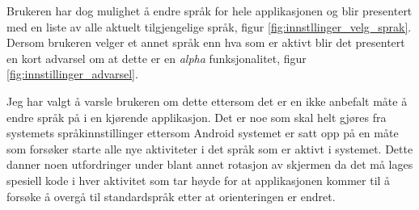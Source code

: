 Brukeren har dog mulighet å endre språk for hele applikasjonen og blir presentert med en liste av alle aktuelt tilgjengelige språk, figur \ref{fig:innstllinger_velg_sprak}. Dersom brukeren velger et annet språk enn hva som er aktivt blir det presentert en kort advarsel om at dette er en \textit{alpha} funksjonalitet, figur \ref{fig:innstillinger_advarsel}. 

Jeg har valgt å varsle brukeren om dette ettersom det er en ikke anbefalt måte å endre språk på i en kjørende applikasjon. Det er noe som skal helt gjøres fra systemets språkinnstillinger ettersom Android systemet er satt opp på en måte som forsøker starte alle nye aktiviteter i det språk som er aktivt i systemet. Dette danner noen utfordringer under blant annet rotasjon av skjermen da det må lages spesiell kode i hver aktivitet som tar høyde for at applikasjonen kommer til å forsøke å overgå til standardspråk etter at orienteringen er endret.


